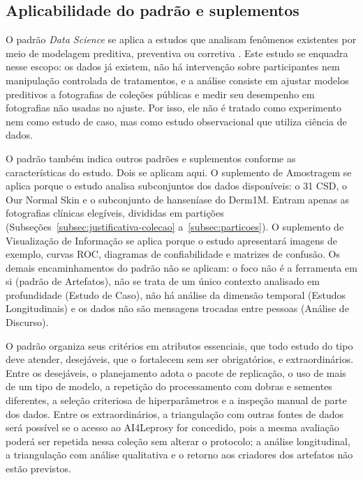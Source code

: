\subsection{Aplicabilidade do padrão e suplementos}
\label{subsec:aplicabilidade}

O padrão \textit{Data Science} se aplica a estudos que analisam fenômenos
existentes por meio de modelagem preditiva, preventiva ou corretiva
\cite{acmSigsoftDataScience}. Este estudo se enquadra nesse escopo: os
dados já existem, não há intervenção sobre participantes nem manipulação
controlada de tratamentos, e a análise consiste em ajustar modelos
preditivos a fotografias de coleções públicas e medir seu desempenho em
fotografias não usadas no ajuste. Por isso, ele não é tratado como
experimento nem como estudo de caso, mas como estudo observacional que
utiliza ciência de dados.

O padrão também indica outros padrões e suplementos conforme as
características do estudo. Dois se aplicam aqui. O suplemento de
Amostragem se aplica porque o estudo analisa subconjuntos dos dados
disponíveis: o 31 CSD, o Our Normal Skin e o subconjunto de hanseníase do Derm1M. Entram apenas as fotografias
clínicas elegíveis, divididas em partições
(Subseções~\ref{subsec:justificativa-colecao} a~\ref{subsec:particoes}).
O suplemento de Visualização de Informação se aplica porque o estudo
apresentará imagens de exemplo, curvas ROC, diagramas de confiabilidade e
matrizes de confusão. Os demais
encaminhamentos do padrão não se aplicam: o foco
não é a ferramenta em si (padrão de Artefatos), não se trata de um único
contexto analisado em profundidade (Estudo de Caso), não há análise da
dimensão temporal (Estudos Longitudinais) e os dados não são mensagens
trocadas entre pessoas (Análise de Discurso).

O padrão organiza seus critérios em atributos essenciais, que todo estudo
do tipo deve atender, desejáveis, que o fortalecem sem ser obrigatórios, e
extraordinários. Entre os desejáveis, o planejamento adota o pacote de
replicação, o uso de mais de um tipo de modelo, a repetição do
processamento com dobras e sementes diferentes, a seleção criteriosa de
hiperparâmetros e a
inspeção manual de parte dos dados. Entre os extraordinários, a
triangulação com outras fontes de dados será possível se o acesso ao
AI4Leprosy for concedido, pois a mesma avaliação poderá ser repetida nessa
coleção sem alterar o protocolo; a análise longitudinal, a triangulação
com análise qualitativa e o retorno aos criadores dos artefatos não estão
previstos.

